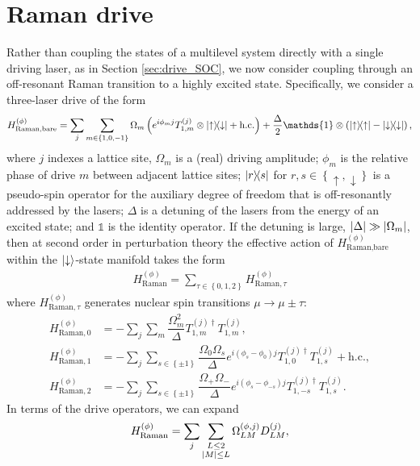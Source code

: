 \documentclass[nofootinbib,notitlepage,11pt]{revtex4-2}
\renewcommand{\t}{\text} %
\newcommand{\f}[2]{\dfrac{#1}{#2}} %
\newcommand{\p}[1]{\left(#1\right)} %
\renewcommand{\set}[1]{\left\{#1\right\}} %
\newcommand{\1}{\mathds{1}}
\newcommand{\up}{\uparrow}
\newcommand{\dn}{\downarrow}
\begin{document}
\section{Raman drive}
\label{sec:drive_raman}

Rather than coupling the states of a multilevel system directly with a
single driving laser, as in Section \ref{sec:drive_SOC}, we now
consider coupling through an off-resonant Raman transition to a highly
excited state.  Specifically, we consider a three-laser drive of the
form
\begin{align}
  H_{\t{Raman,bare}}^{(\phi)}
  = \sum_j \sum_{m\in\set{1,0,-1}} \Omega_m \p{e^{i\phi_m j}
    T_{1,m}^{(j)} \otimes \op{\up}{\dn} + \t{h.c.}}
  + \f{\Delta}{2} \1 \otimes \p{\op{\up} - \op{\dn}},
  \label{eq:raman_bare}
\end{align}
where $j$ indexes a lattice site, $\Omega_m$ is a (real) driving
amplitude; $\phi_m$ is the relative phase of drive $m$ between
adjacent lattice sites; $\op{r}{s}$ for $r,s\in\set{\up,\dn}$ is a
pseudo-spin operator for the auxiliary degree of freedom that is
off-resonantly addressed by the lasers; $\Delta$ is a detuning of the
lasers from the energy of an excited state; and $\1$ is the identity
operator.  If the detuning is large, $\abs{\Delta}\gg\abs{\Omega_m}$,
then at second order in perturbation theory the effective action of
$H_{\t{Raman,bare}}^{(\phi)}$ within the $\ket{\dn}$-state manifold
takes the form
\begin{align}
  H_{\t{Raman}}^{(\phi)}
  = \sum_{\tau\in\set{0,1,2}} H_{\t{Raman},\tau}^{(\phi)}
\end{align}
where $H_{\t{Raman},\tau}^{(\phi)}$ generates nuclear spin transitions
$\mu\to\mu\pm\tau$:
\begin{align}
  H_{\t{Raman},0}^{(\phi)}
  &= -\sum_j\sum_m \f{\Omega_m^2}{\Delta}
  T_{1,m}^{(j)\dag} T_{1,m}^{(j)},
  \label{eq:raman_0} \\
  H_{\t{Raman},1}^{(\phi)}
  &= -\sum_j\sum_{s\in\set{\pm1}}
  \f{\Omega_0\Omega_s}{\Delta} e^{i\p{\phi_s-\phi_0} j}
  T_{1,0}^{(j)\dag} T_{1,s}^{(j)} + \t{h.c.},
  \\
  H_{\t{Raman},2}^{(\phi)}
  &= -\sum_j\sum_{s\in\set{\pm1}}
  \f{\Omega_+\Omega_-}{\Delta} e^{i\p{\phi_s-\phi_{-s}}j}
  T_{1,-s}^{(j)\dag} T_{1,s}^{(j)}.
  \label{eq:raman_2}
\end{align}
In terms of the drive operators, we can expand
\begin{align}
  H_{\t{Raman}}^{(\phi)}
  = \sum_j \sum_{\substack{L\le2\\\abs{M}\le L}}
  \Omega_{LM}^{(\phi,j)} D_{LM}^{(j)},
  \label{eq:raman_drive}
\end{align}
\end{document}
